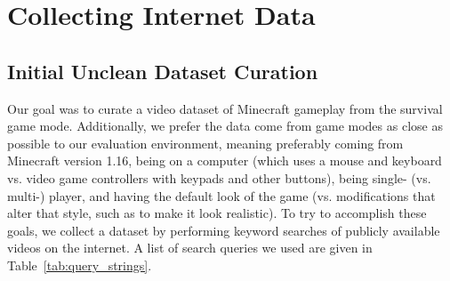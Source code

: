 \section{Collecting Internet Data}
\label{appendix:collecting_internet_data}
\subsection{Initial Unclean Dataset Curation}\label{section:data_collection}

Our goal was to curate a video dataset of Minecraft gameplay from the survival game mode. Additionally, we prefer the data come from game modes as close as possible to our evaluation environment, meaning preferably coming from Minecraft version 1.16, being on a computer (which uses a mouse and keyboard vs. video game controllers with keypads and other buttons), being single- (vs. multi-) player, and having the default look of the game (vs. modifications that alter that style, such as to make it look realistic). To try to accomplish these goals, we collect a dataset by performing keyword searches of publicly available videos on the internet. A list of search queries we used are given in Table~\ref{tab:query_strings}.

